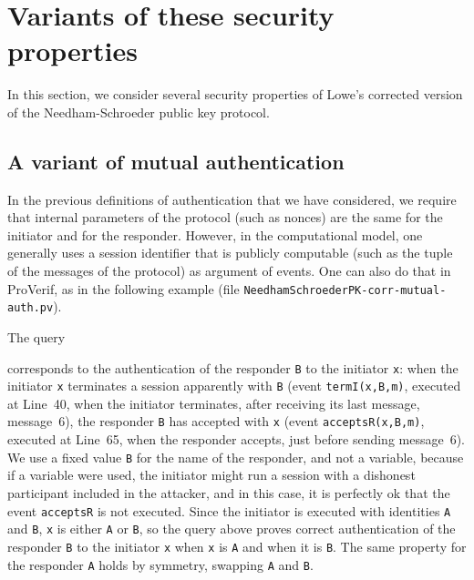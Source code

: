 \documentclass{book}
\begin{document}
\section{Variants of these security properties}

In this section, we consider several security properties of Lowe's corrected
version of the Needham-Schroeder public key protocol.

\subsection{A variant of mutual authentication}
\label{sec:var:mutual-auth}

In the previous definitions of authentication that we have considered,
we require that internal parameters of the protocol (such as nonces)
are the same for the initiator and for the responder. However, in the
computational model, one generally uses a session identifier that is
publicly computable (such as the tuple of the messages of the
protocol) as argument of events. One can also do that in ProVerif, as
in the following example (file {\tt {\docexdir}NeedhamSchroederPK-corr-mutual-auth.pv}).
%

%
The query
%

%
corresponds to the authentication of the responder \lstinline!B! to
the initiator \lstinline!x!: when the initiator \lstinline!x!
terminates a session apparently with \lstinline!B! (event
\lstinline!termI(x,B,m)!, executed at Line~40, when the initiator
terminates, after receiving its last message, message~6), the
responder \lstinline!B!  has accepted with \lstinline!x! (event
\lstinline!acceptsR(x,B,m)!, executed at Line~65, when the responder
accepts, just before sending message~6).
%
We use a fixed value \lstinline!B! for the name of the responder, and
not a variable, because if a variable were used, the initiator might
run a session with a dishonest participant included in the attacker,
and in this case, it is perfectly ok that the event \lstinline!acceptsR!
is not executed.
%
Since the initiator is executed with identities \lstinline!A! and
\lstinline!B!, \lstinline!x! is either \lstinline!A! or \lstinline!B!,
so the query above proves correct authentication of the responder
\lstinline!B! to the initiator \lstinline!x! when \lstinline!x! is
\lstinline!A! and when it is \lstinline!B!. The same property for the
responder \lstinline!A! holds by symmetry, swapping \lstinline!A! and
\lstinline!B!.
\end{document}
